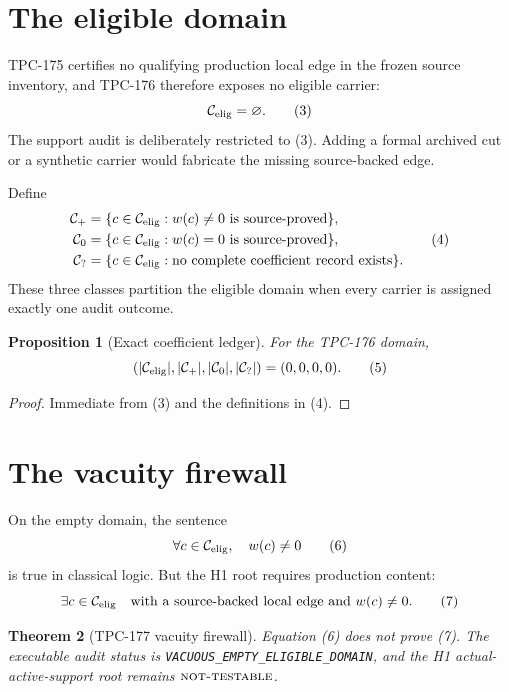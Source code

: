 \documentclass[11pt]{article}
\newtheorem{theorem}{Theorem}[section]
\newtheorem{proposition}[theorem]{Proposition}
\theoremstyle{definition}
\theoremstyle{remark}
\newcommand{\NT}{\textnormal{\textsc{not-testable}}}
\begin{document}
\section{The eligible domain}

TPC-175 certifies no qualifying production local edge in the frozen
source inventory, and TPC-176 therefore exposes no eligible carrier:
\[
 \mathcal C_{\rm elig}=\varnothing.                               \tag{3}
\]
The support audit is deliberately restricted to (3).  Adding a
formal archived cut or a synthetic carrier would fabricate the
missing source-backed edge.

Define
\[
\begin{aligned}
 \mathcal C_{+}&=\{c\in\mathcal C_{\rm elig}:w(c)\ne0
                     \text{ is source-proved}\},\\
 \mathcal C_{0}&=\{c\in\mathcal C_{\rm elig}:w(c)=0
                     \text{ is source-proved}\},\\
 \mathcal C_{?}&=\{c\in\mathcal C_{\rm elig}:
                     \text{no complete coefficient record exists}\}.
\end{aligned}                                                     \tag{4}
\]
These three classes partition the eligible domain when every carrier
is assigned exactly one audit outcome.

\begin{proposition}[Exact coefficient ledger]
For the TPC-176 domain,
\[
 (|\mathcal C_{\rm elig}|,|\mathcal C_{+}|,
   |\mathcal C_{0}|,|\mathcal C_{?}|)=(0,0,0,0).                  \tag{5}
\]
\end{proposition}

\begin{proof}
Immediate from (3) and the definitions in (4).
\end{proof}

\section{The vacuity firewall}

On the empty domain, the sentence
\[
  \forall c\in\mathcal C_{\rm elig},\quad w(c)\ne0                \tag{6}
\]
is true in classical logic.  But the H1 root requires production
content:
\[
  \exists c\in\mathcal C_{\rm elig}
  \quad\text{with a source-backed local edge and }w(c)\ne0.       \tag{7}
\]

\begin{theorem}[TPC-177 vacuity firewall]
Equation (6) does not prove (7).  The executable audit status is
\texttt{VACUOUS\_EMPTY\_ELIGIBLE\_DOMAIN}, and the H1
actual-active-support root remains \(\NT\).
\end{theorem}
\end{document}
